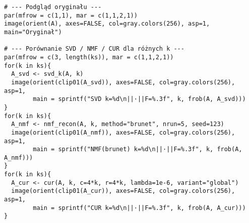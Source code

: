 \documentclass[12pt]{article}
\begin{document}
\begin{verbatim}
# --- Podgląd oryginału ---
par(mfrow = c(1,1), mar = c(1,1,2,1))
image(orient(A), axes=FALSE, col=gray.colors(256), asp=1, main="Oryginał")

# --- Porównanie SVD / NMF / CUR dla różnych k ---
par(mfrow = c(3, length(ks)), mar = c(1,1,2,1))
for(k in ks){
  A_svd <- svd_k(A, k)
  image(orient(clip01(A_svd)), axes=FALSE, col=gray.colors(256), asp=1,
        main = sprintf("SVD k=%d\n||·||F=%.3f", k, frob(A, A_svd)))
}
for(k in ks){
  A_nmf <- nmf_recon(A, k, method="brunet", nrun=5, seed=123)
  image(orient(clip01(A_nmf)), axes=FALSE, col=gray.colors(256), asp=1,
        main = sprintf("NMF(brunet) k=%d\n||·||F=%.3f", k, frob(A, A_nmf)))
}
for(k in ks){
  A_cur <- cur(A, k, c=4*k, r=4*k, lambda=1e-6, variant="global")
  image(orient(clip01(A_cur)), axes=FALSE, col=gray.colors(256), asp=1,
        main = sprintf("CUR k=%d\n||·||F=%.3f", k, frob(A, A_cur)))
}


\end{verbatim}
\end{document}
